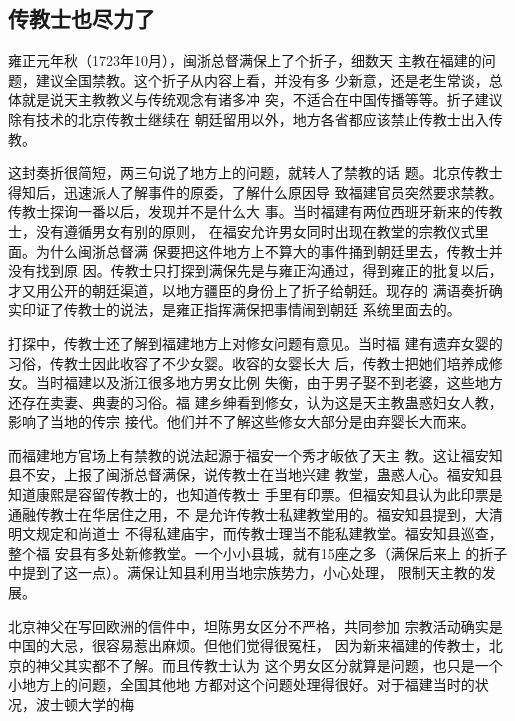 \subsection{传教士也尽力了}
\par
雍正元年秋（1723年10月），闽浙总督满保上了个折子，细数天%
主教在福建的问题，建议全国禁教。这个折子从内容上看，并没有多%
少新意，还是老生常谈，总体就是说天主教教义与传统观念有诸多冲%
突，不适合在中国传播等等。折子建议除有技术的北京传教士继续在%
朝廷留用以外，地方各省都应该禁止传教士出入传教。%
\par
这封奏折很简短，两三句说了地方上的问题，就转人了禁教的话%
题。北京传教士得知后，迅速派人了解事件的原委，了解什么原因导%
致福建官员突然要求禁教。传教士探询一番以后，发现并不是什么大%
事。当时福建有两位西班牙新来的传教士，没有遵循男女有别的原则，%
在福安允许男女同时出现在教堂的宗教仪式里面。为什么闽浙总督满%
保要把这件地方上不算大的事件捅到朝廷里去，传教士并没有找到原%
因。传教士只打探到满保先是与雍正沟通过，得到雍正的批复以后，%
才又用公开的朝廷渠道，以地方疆臣的身份上了折子给朝廷。现存的%
满语奏折确实印证了传教士的说法，是雍正指挥满保把事情闹到朝廷%
系统里面去的。%
\par
打探中，传教士还了解到福建地方上对修女问题有意见。当时福%
建有遗弃女婴的习俗，传教士因此收容了不少女婴。收容的女婴长大%
后，传教士把她们培养成修女。当时福建以及浙江很多地方男女比例%
失衡，由于男子娶不到老婆，这些地方还存在卖妻、典妻的习俗。福%
建乡绅看到修女，认为这是天主教蛊惑妇女人教，影响了当地的传宗%
接代。他们并不了解这些修女大部分是由弃婴长大而来。%
\par
而福建地方官场上有禁教的说法起源于福安一个秀才皈依了天主%
教。这让福安知县不安，上报了闽浙总督满保，说传教士在当地兴建%
教堂，蛊惑人心。福安知县知道康熙是容留传教士的，也知道传教士%
手里有印票。但福安知县认为此印票是通融传教士在华居住之用，不%
是允许传教士私建教堂用的。福安知县提到，大清明文规定和尚道士%
不得私建庙宇，而传教士理当不能私建教堂。福安知县巡查，整个福%
安县有多处新修教堂。一个小小县城，就有15座之多（满保后来上%
的折子中提到了这一点）。满保让知县利用当地宗族势力，小心处理，%
限制天主教的发展。%
\par
北京神父在写回欧洲的信件中，坦陈男女区分不严格，共同参加%
宗教活动确实是中国的大忌，很容易惹出麻烦。但他们觉得很冤枉，%
因为新来福建的传教士，北京的神父其实都不了解。而且传教士认为%
这个男女区分就算是问题，也只是一个小地方上的问题，全国其他地%
方都对这个问题处理得很好。对于福建当时的状况，波士顿大学的梅%
